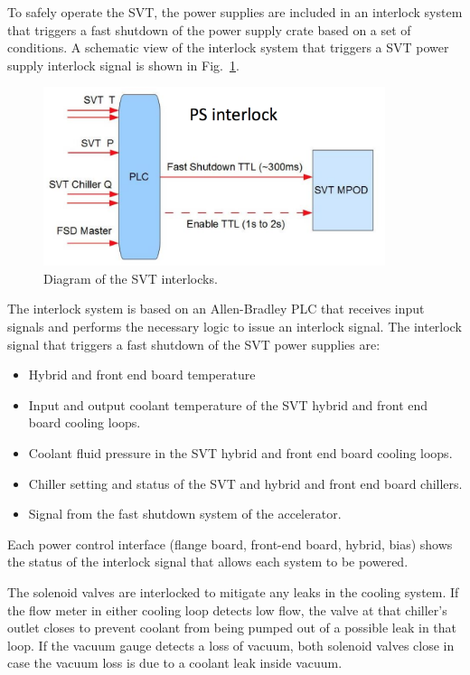 \documentclass[12pt]{report}
\begin{document}
To safely operate the SVT, the power supplies are included in an interlock system that triggers a fast shutdown of the power supply crate based on a set of conditions. A schematic view of the interlock system that triggers a SVT power supply interlock signal is shown in Fig.~\ref{fig:svt_interlock_diagram}. 
\begin{figure}
\includegraphics[width=10cm]{svt_interlock_diagram}
\caption{Diagram of the SVT interlocks.\label{fig:svt_interlock_diagram}}
\end{figure}
The interlock system is based on an Allen-Bradley PLC that receives input signals and performs the necessary logic to issue an interlock signal. The interlock signal that triggers a fast shutdown of the SVT power supplies are:
\begin{itemize}
\item Hybrid and front end board temperature
\item Input and output coolant temperature of the SVT hybrid and front end board cooling loops.
\item Coolant fluid pressure in the SVT hybrid and front end board cooling loops.
\item Chiller setting and status of the SVT and hybrid and front end board chillers.
\item Signal from the fast shutdown system of the accelerator. 
\end{itemize}
 Each power control interface (flange board, front-end board, hybrid, bias) shows the status of the interlock signal that allows each system to be powered. 

The solenoid valves are interlocked to mitigate any leaks in the cooling system. 
If the flow meter in either cooling loop detects low flow, the valve at that chiller's outlet closes to prevent coolant from being pumped out of a possible leak in that loop. 
If the vacuum gauge detects a loss of vacuum, both solenoid valves close in case the vacuum loss is due to a coolant leak inside vacuum.
\end{document}
